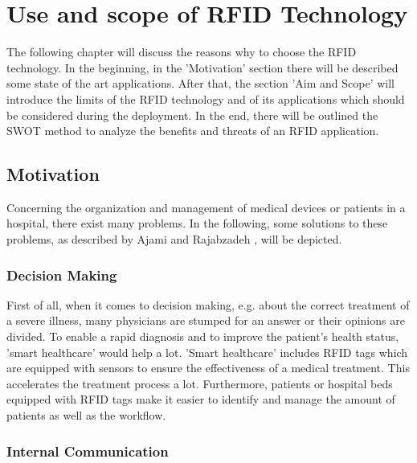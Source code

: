 \chapter{Use and scope of RFID Technology}
\label{Kap1}

The following chapter will discuss the reasons why to choose the RFID technology. In the beginning, in the 'Motivation' section there will be described some state of the art applications. After that, the section 'Aim and Scope' will introduce the limits of the RFID technology and of its applications which should be considered during the deployment. In the end, there will be outlined the \ac{SWOT} method to analyze the benefits and threats of an RFID application.

\section{Motivation}

Concerning the organization and management of medical devices or patients in a hospital, there exist many problems. In the following, some solutions to these problems, as described by Ajami and Rajabzadeh \cite{ncbi}, will be depicted.

\subsection{Decision Making}

First of all, when it comes to decision making, e.g. about the correct treatment of a severe illness, many physicians are stumped for an answer or their opinions are divided. To enable a rapid diagnosis and to improve the patient's health status, 'smart healthcare' \cite{henrici} would help a lot. 'Smart healthcare' includes RFID tags which are equipped with sensors to ensure the effectiveness of a medical treatment. This accelerates the treatment process a lot. Furthermore, patients or hospital beds equipped with RFID tags make it easier to identify and manage the amount of patients as well as the workflow.

\subsection{Internal Communication}

